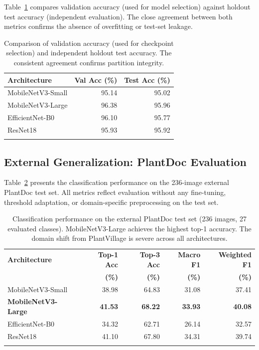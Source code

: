 \documentclass[pdflatex,sn-mathphys-num]{sn-jnl}
\theoremstyle{thmstyleone}%
\theoremstyle{thmstyletwo}%
\theoremstyle{thmstylethree}%
\begin{document}
Table~\ref{tab:val_vs_holdout} compares validation accuracy (used for model selection)
against holdout test accuracy (independent evaluation). The close agreement between
both metrics confirms the absence of overfitting or test-set leakage.

\begin{table}[h]
\caption{Comparison of validation accuracy (used for checkpoint selection) and
independent holdout test accuracy. The consistent agreement confirms
partition integrity.}\label{tab:val_vs_holdout}%
\begin{tabular*}{\textwidth}{@{\extracolsep\fill}lrr}
\toprule
\textbf{Architecture} & \textbf{Val Acc (\%)} & \textbf{Test Acc (\%)} \\
\midrule
MobileNetV3-Small  & 95.14 & 95.02 \\
MobileNetV3-Large  & 96.38 & 95.96 \\
EfficientNet-B0    & 96.10 & 95.77 \\
ResNet18           & 95.93 & 95.92 \\
\botrule
\end{tabular*}
\end{table}

\subsection{External Generalization: PlantDoc Evaluation}
\label{sec:results_plantdoc}

Table~\ref{tab:plantdoc_results} presents the classification performance on the 236-image
external PlantDoc test set. All metrics reflect evaluation without any fine-tuning,
threshold adaptation, or domain-specific preprocessing on the test set.

\begin{table}[h]
\caption{Classification performance on the external PlantDoc test set (236 images,
27 evaluated classes). MobileNetV3-Large achieves the highest top-1 accuracy.
The domain shift from PlantVillage is severe across all architectures.}\label{tab:plantdoc_results}%
\setlength{\tabcolsep}{5pt}%
\begin{tabular*}{\textwidth}{@{\extracolsep\fill}lrrrr}
\toprule
\textbf{Architecture} & \textbf{Top-1 Acc} & \textbf{Top-3 Acc} & \textbf{Macro F1} & \textbf{Weighted F1} \\
& \textbf{(\%)} & \textbf{(\%)} & \textbf{(\%)} & \textbf{(\%)} \\
\midrule
MobileNetV3-Small  & 38.98 & 64.83 & 31.08 & 37.41 \\
\textbf{MobileNetV3-Large}  & \textbf{41.53} & \textbf{68.22} & \textbf{33.93} & \textbf{40.08} \\
EfficientNet-B0    & 34.32 & 62.71 & 26.14 & 32.57 \\
ResNet18           & 41.10 & 67.80 & 34.31 & 39.74 \\
\botrule
\end{tabular*}
\end{table}
\end{document}
